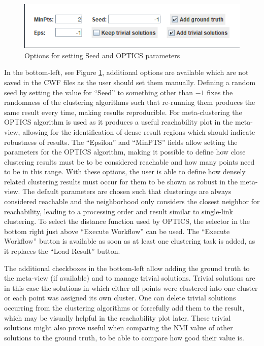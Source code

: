 \documentclass[
	a4paper,
	english,
	twoside,
	openright,               
	11pt                            
	]{report}
\begin{document}
\begin{figure}[h]
	\centering
	\includegraphics[scale=.75]{workflow-options}
	\caption{Options for setting Seed and OPTICS parameters}
	\label{fig:workflow-options}
\end{figure}

In the bottom-left, see Figure \ref{fig:workflow-options}, additional options are available which are not saved in the CWF files as the user should set them manually. Defining a random seed by setting the value for ``Seed'' to something other than $-1$ fixes the randomness of the clustering algorithms such that re-running them produces the same result every time, making results reproducible. For meta-clustering the OPTICS \cite{10.1145/304181.304187} algorithm is used as it produces a useful reachability plot in the meta-view, allowing for the identification of dense result regions which should indicate robustness of results. The ``Epsilon'' and ``MinPTS'' fields allow setting the parameters for the OPTICS algorithm, making it possible to define how close clustering results must be to be considered reachable and how many points need to be in this range. With these options, the user is able to define how densely related clustering results must occur for them to be shown as robust in the meta-view. The default parameters are chosen such that clusterings are always considered reachable and the neighborhood only considers the closest neighbor for reachability, leading to a processing order and result similar to single-link clustering. To select the distance function used by OPTICS, the selector in the bottom right just above ``Execute Workflow'' can be used. The ``Execute Workflow'' button is available as soon as at least one clustering task is added, as it replaces the ``Load Result'' button.

The additional checkboxes in the bottom-left allow adding the ground truth to the meta-view (if available) and to manage trivial solutions. Trivial solutions are in this case the solutions in which either all points were clustered into one cluster or each point was assigned its own cluster. One can delete trivial solutions occurring from the clustering algorithms or forcefully add them to the result, which may be visually helpful in the reachability plot later. These trivial solutions might also prove useful when comparing the NMI value of other solutions to the ground truth, to be able to compare how good their value is.
\end{document}
